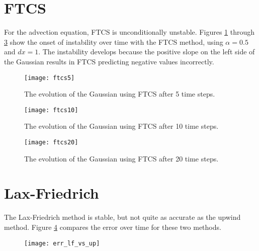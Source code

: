 \documentclass{article}
\begin{document}
\section{FTCS}
For the advection equation, FTCS is unconditionally unstable.  Figures \ref{fig:ftcs5} through \ref{fig:ftcs20}
show the onset of instability over time with the FTCS method, using $\alpha=0.5$ and $dx=1$.  The instability develops
because the positive slope on the left side of the Gaussian results in FTCS predicting negative values incorrectly.

\begin{figure}[h]
  \begin{center}
     \texttt{[image: ftcs5]}
  \end{center}
  \label{fig:ftcs5}
  \caption{The evolution of the Gaussian using FTCS after 5 time steps.}
\end{figure}

\begin{figure}[h]
  \begin{center}
     \texttt{[image: ftcs10]}
  \end{center}
  \label{fig:ftcs10}
\caption{The evolution of the Gaussian using FTCS after 10 time steps.}
\end{figure}

\begin{figure}[h]
  \begin{center}
     \texttt{[image: ftcs20]}
  \end{center}
  \label{fig:ftcs20}
\caption{The evolution of the Gaussian using FTCS after 20 time steps.}
\end{figure}

\section{Lax-Friedrich}
The Lax-Friedrich method is stable, but not quite as accurate as the upwind method.  Figure \ref{fig:compare}
compares the error over time for these two methods.

\begin{figure}[h]
  \begin{center}
     \texttt{[image: err\_lf\_vs\_up]}
  \end{center}
  \label{fig:compare}
\end{figure}
\end{document}

